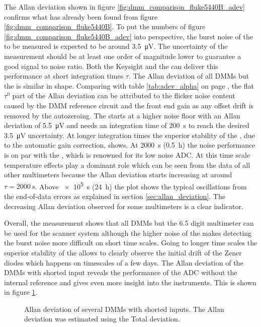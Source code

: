 The Allan deviation shown in figure \ref{fig:dmm_comparison_fluke5440B_adev} confirms what has already been found from figure \ref{fig:dmm_comparison_fluke5440B}. To put the numbers of figure \ref{fig:dmm_comparison_fluke5440B_adev} into perspective, the burst noise of the  to be measured is expected to be around \qty{3.5}{\uV}. The uncertainty of the measurement should be at least one order of magnitude lower to guarantee a good signal to noise ratio. Both the Keysight  and the  can deliver this performance at short integration times $\tau$. The Allan deviation of all DMMs but the  is similar in shape. Comparing with table \ref{tab:adev_alpha} on page \pageref{tab:adev_alpha}, the flat $\tau^0$ part of the Allan deviation can be attributed to the flicker noise content caused by the DMM reference circuit and the front end gain as any offset drift is removed by the autozeroing. The  starts at a higher noise floor with an Allan deviation of \qty{5.5}{\uV} and needs an integration time of \qty{200}{\second} to reach the desired \qty{3.5}{\uV} uncertainty. At longer integration times the superior stability of the , due to the automatic gain correction, shows. At \qty{2000}{\s} (\qty{0.5}{\hour}) the noise performance is on par with the , which is renowned for its low noise ADC. At this time scale temperature effects play a dominant role which can be seen from the data of all other multimeters because the Allan deviation starts increasing at around $\tau = \qty{2000}{\second}$. Above \qty{e5}{\second} (\qty{24}{\hour}) the plot shows the typical oscillations from the end-of-data errors as explained in section \ref{sec:allan_deviation}. The decreasing Allan deviation observed for some multimeters is a clear indicator.

Overall, the measurement shows that all DMMs but the \num{6.5} digit multimeter can be used for the scanner system although the higher noise of the  makes detecting the burst noise more difficult on short time scales. Going to longer time scales the superior stability of the  allows to clearly observe the initial drift of the Zener diodes which happens on timescales of a few days. The Allan deviation of the DMMs with shorted input reveals the performance of the ADC without the internal reference and gives even more insight into the instruments. This is shown in figure \ref{fig:dmm_comparison_shorted_adev}.
\begin{figure}[ht]
    \centering
    \caption{Allan deviation of several DMMs with shorted inputs. The Allan deviation was estimated using the Total deviation.}
    \label{fig:dmm_comparison_shorted_adev}
\end{figure}

